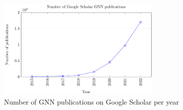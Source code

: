 \begin{figure}[t]
    \centering
    \includegraphics[width=0.7\textwidth]{Images/google_scholar}
    \caption{Number of GNN publications on Google Scholar per year}
    \label{fig:google_scholar}
\end{figure}


